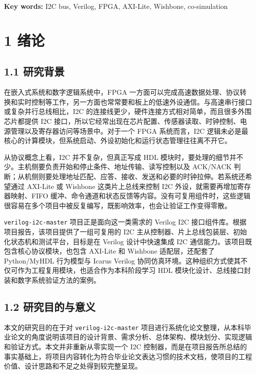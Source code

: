 \textbf{Key words:} I2C bus, Verilog, FPGA, AXI-Lite, Wishbone, co-simulation

\section{1 绪论}\label{ux7eeaux8bba}

\subsection{1.1 研究背景}\label{ux7814ux7a76ux80ccux666f}

在嵌入式系统和数字逻辑系统中，FPGA 一方面可以完成高速数据处理、协议转换和实时控制等工作，另一方面也常常要和板上的低速外设通信。与高速串行接口或复杂并行总线相比，I2C 的连接线更少，硬件连接方式相对简单，而且很多外围芯片都提供 I2C 接口，所以它经常出现在芯片配置、传感器读取、时钟控制、电源管理以及寄存器访问等场景中。对于一个 FPGA 系统而言，I2C 逻辑未必是最核心的计算模块，但系统启动、外设初始化和运行状态管理往往离不开它。

从协议概念上看，I2C 并不复杂，但真正写成 HDL 模块时，要处理的细节并不少。主机侧要负责开始和停止条件、地址传输、读写控制以及 ACK/NACK 判断；从机侧则要处理地址匹配、应答、接收、发送和必要的时钟拉伸。若系统还希望通过 AXI-Lite 或 Wishbone 这类片上总线来控制 I2C 外设，就需要再增加寄存器映射、FIFO 缓冲、命令通道和状态反馈等内容。没有可复用组件时，这些逻辑很容易在多个项目中被反复编写，既影响效率，也会让验证工作变得零散。

\texttt{verilog-i2c-master} 项目正是面向这一类需求的 Verilog I2C 接口组件库。根据项目报告，该项目提供了一组可复用的 I2C 主从控制器、片上总线包装层、初始化状态机和测试平台，目标是在 Verilog 设计中快速集成 I2C 通信能力。该项目既包含核心协议模块，也包含 AXI-Lite 和 Wishbone 适配层，还配套了 Python/MyHDL 行为模型与 Icarus Verilog 协同仿真环境。这种组织方式使其不仅可作为工程复用模块，也适合作为本科阶段学习 HDL 模块化设计、总线接口封装和数字系统验证方法的案例。

\subsection{1.2 研究目的与意义}\label{ux7814ux7a76ux76eeux7684ux4e0eux610fux4e49}

本文的研究目的在于对 \texttt{verilog-i2c-master} 项目进行系统化论文整理，从本科毕业论文的角度说明该项目的设计背景、需求分析、总体架构、模块划分、实现逻辑和验证方式。本文并非重新从零实现一个 I2C 控制器，而是在项目报告所总结的事实基础上，将项目内容转化为符合毕业论文表达习惯的技术文档，使项目的工程价值、设计思路和不足之处得到较完整呈现。

